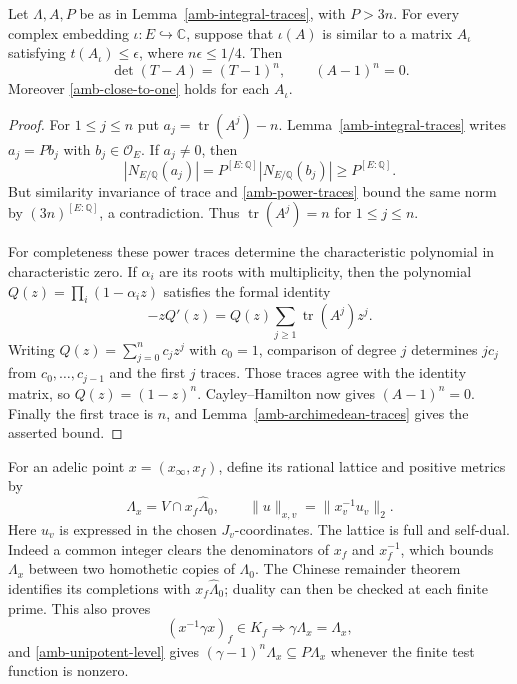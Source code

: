 \begin{proposition}\label{amb-near-unipotent}
Let $\Lambda,A,P$ be as in Lemma~\ref{amb-integral-traces}, with
$P>3n$. For every complex embedding $\iota:E\hookrightarrow
\mathbb C$, suppose that $\iota(A)$ is similar to a matrix
$A_\iota$ satisfying $t(A_\iota)\le\epsilon$, where
$n\epsilon\le1/4$. Then
\begin{equation}\label{amb-unipotence}
                   \det(T-A)=(T-1)^n,
                   \qquad(A-1)^n=0.
\end{equation}
Moreover \eqref{amb-close-to-one} holds for each $A_\iota$.
\end{proposition}
\begin{proof}
For $1\le j\le n$ put $a_j=\operatorname{tr}(A^j)-n$.
Lemma~\ref{amb-integral-traces} writes $a_j=P b_j$ with
$b_j\in\mathcal O_E$. If $a_j\ne0$, then
\[
 |N_{E/\mathbb Q}(a_j)|
       =P^{[E:\mathbb Q]}|N_{E/\mathbb Q}(b_j)|
       \ge P^{[E:\mathbb Q]}.
\]
But similarity invariance of trace and
\eqref{amb-power-traces} bound the same norm by
$(3n)^{[E:\mathbb Q]}$, a contradiction. Thus
$\operatorname{tr}(A^j)=n$ for $1\le j\le n$.

For completeness these power traces determine the characteristic
polynomial in characteristic zero. If $\alpha_i$ are its roots
with multiplicity, then the polynomial
$Q(z)=\prod_i(1-\alpha_i z)$ satisfies the formal identity
\[
             -zQ'(z)=Q(z)\sum_{j\ge1}
                              \operatorname{tr}(A^j)z^j.
\]
Writing $Q(z)=\sum_{j=0}^n c_jz^j$ with $c_0=1$, comparison
of degree $j$ determines $j c_j$ from $c_0,\ldots,c_{j-1}$ and
the first $j$ traces. Those traces agree with the identity matrix,
so $Q(z)=(1-z)^n$. Cayley--Hamilton now gives
$(A-1)^n=0$. Finally the first trace is $n$, and
Lemma~\ref{amb-archimedean-traces} gives the asserted bound.
\end{proof}

For an adelic point $x=(x_\infty,x_f)$, define its rational
lattice and positive metrics by
\begin{equation}\label{amb-point-lattice}
 \Lambda_x=V\cap x_f\widehat\Lambda_0,
 \qquad\|u\|_{x,v}=\|x_v^{-1}u_v\|_2.
\end{equation}
Here $u_v$ is expressed in the chosen $J_v$-coordinates.
The lattice is full and self-dual. Indeed a common integer clears
the denominators of $x_f$ and $x_f^{-1}$, which bounds
$\Lambda_x$ between two homothetic copies of $\Lambda_0$.
The Chinese remainder theorem identifies its completions with
$x_f\widehat\Lambda_0$; duality can then be checked at each
finite prime. This also proves
\[
 (x^{-1}\gamma x)_f\in K_f\Longrightarrow
                        \gamma\Lambda_x=\Lambda_x,
\]
and \eqref{amb-unipotent-level} gives
$(\gamma-1)^n\Lambda_x\subseteq P\Lambda_x$ whenever the
finite test function is nonzero.

